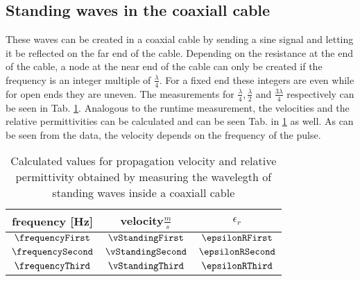 \documentclass[a4paper,10pt,twocolumn]{article}
\begin{document}
    \subsection{Standing waves in the coaxiall cable}
    \label{subsec:standingWavesCoax}
    These waves can be created in a coaxial cable by sending a sine signal and letting it be reflected on the far end of the cable.
    Depending on the resistance at the end of the cable, a node at the near end of the cable can only be created if the frequency is an integer multiple of $\frac{\lambda}{4}$.
    For a fixed end these integers are even while for open ends they are uneven.
    The measurements for $\frac{\lambda}{4},\frac{\lambda}{2}$ and $\frac{3\lambda}{4}$ respectively can be seen in Tab. \ref{tab:standingWaveData}.
    Analogous to the runtime measurement, the velocities and the relative permittivities can be calculated and can be seen Tab. in \ref{tab:standingWaveData} as well.
    As can be seen from the data, the velocity depends on the frequency of the pulse.
    \begin{table}[htbp]          %
        \centering
        \fontsize{8pt}{8pt}
        \begin{tabular*}{\linewidth}{@{\extracolsep{\fill}}ccc}
            \hline
            \hline
            \rule[-5pt]{0pt}{23pt}  frequency [Hz]  & velocity$ \frac{m}{s}$ & $\epsilon_r$   	 \\
            \hline
            \rule[-5pt]{0pt}{23pt}  \tiny $ \frequencyFirst$ & \tiny$ \vStandingFirst$ &   \tiny$ \epsilonRFirst$  	 \\
            \rule[-5pt]{0pt}{23pt}    \tiny$\frequencySecond$ & \tiny$ \vStandingSecond$ &   \tiny$ \epsilonRSecond$  	 \\
            \rule[-5pt]{0pt}{23pt}   \tiny$ \frequencyThird$ & \tiny$ \vStandingThird$ &   \tiny$ \epsilonRThird$  	 \\
            \hline
            \hline
        \end{tabular*}
        \caption[]{Calculated values for propagation velocity and relative permittivity obtained by measuring the wavelegth of standing waves inside a coaxiall cable}  %
        \label{tab:standingWaveData}                             %
    \end{table} 
    
\end{document}

